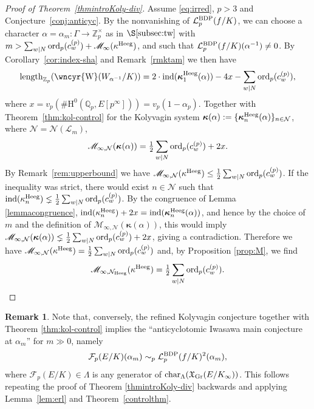 \documentclass[10pt,reqno]{amsart}
\numberwithin{equation}{section}
\theoremstyle{plain}
\theoremstyle{definition}
\newtheorem{rmk}[thm]{Remark}
\theoremstyle{definition}
\theoremstyle{plain}
\theoremstyle{plain}
\theoremstyle{plain}
\theoremstyle{plain}
\theoremstyle{plain}
\theoremstyle{plain}
\newcommand{\ind}{\operatorname{ind}}
\newcommand{\Z}{\mathbb{Z}}
\newcommand{\Q}{\mathbb{Q}}
\newcommand{\bkappa}{\boldsymbol{\kappa}}
\newcommand{\sha}{\text{\wncyr{W}}}
\newcommand{\Lcal}{\mathcal{L}}
\newcommand{\Fcal}{\mathcal{F}}
\newcommand{\cL}{\mathcal{L}}
\newcommand{\cN}{\mathcal{N}}
\newcommand{\kap}{\kappa}
\newcommand{\rH}{\mathrm{H}}
\begin{document}
\begin{proof}[Proof of Theorem~\ref{thmintroKoly-div}]
Assume \eqref{eq:irred}, $p>3$ and Conjecture~\ref{conj:anticyc}. By the nonvanishing of $\Lcal_p^{\rm BDP}(f/K)$, %
we can choose a character $\alpha=\alpha_m:\Gamma\rightarrow\Z_p^\times$ as in $\S\ref{subsec:tw}$ with $m>\sum_{w\mid N}{\rm ord}_p(c_w^{(p)})+\mathscr{M}_\infty(\kappa^{\rm Heeg})$, and such that $\Lcal_p^{\rm BDP}(f/K)(\alpha^{-1})\neq 0$. By Corollary~\ref{cor:index-sha} and Remark~\ref{rmktam} we then have 
\begin{equation}\label{eq:control-divalpha}
{\rm length}_{\Z_p}(\sha(W_{\alpha^{-1}}/K))=2\cdot\ind(\bkappa_1^{\rm Heeg}(\alpha))-4x-\sum_{w\mid N}{\rm ord}_p(c_w^{(p)}),
\end{equation}
where $x= v_p(\#\rH^0(\Q_p,E[p^\infty]))= v_p(1-\alpha_p)$.
Together with Theorem~\ref{thm:kol-control} for the Kolyvagin system $\bkappa(\alpha):=\{\bkappa^{\rm Heeg}_n(\alpha)\}_{n\in\mathcal{N}}$, where $\mathcal{N}=\mathcal{N}(\cL_{m})$,
\[
\mathscr{M}_{\infty,\cN}(\bkappa(\alpha))=\tfrac{1}{2}\sum_{w\mid N}{\rm ord}_p(c_w^{(p)})+2x.
\]
By Remark~\ref{rem:upperbound} we have $\mathscr{M}_{\infty,\cN}(\kappa^{\rm Heeg}) \leq \tfrac{1}{2}\sum_{w\mid N}{\rm ord}_p(c_w^{(p)})$. If the inequality was strict, there would exist $n\in\mathcal{N}$ such that $\ind(\kappa_n^{\rm Heeg})\lneq \tfrac{1}{2}\sum_{w\mid N}{\rm ord}_p(c_w^{(p)})$. By the congruence of Lemma \ref{lemmacongruence}, $\ind(\kappa_n^{\rm Heeg})+2x=\ind(\bkappa_n^{\rm Heeg}(\alpha))$, and hence by the choice of $m$ and the definition of $\mathscr{M}_{\infty,\cN}(\bkappa(\alpha))$, this would imply $\mathscr{M}_{\infty,\cN}(\bkappa(\alpha))\lneq \tfrac{1}{2}\sum_{w\mid N}{\rm ord}_p(c_w^{(p)})+2x$, giving a contradiction. Therefore we have $\mathscr{M}_{\infty,\cN}(\kappa^{\rm Heeg}) = \tfrac{1}{2}\sum_{w\mid N}{\rm ord}_p(c_w^{(p)})$ and, by Proposition \ref{prop:M}, we find
\[
\mathscr{M}_{\infty,\cN_{\rm Heeg}}(\kappa^{\rm Heeg})= \tfrac{1}{2}\sum_{w\mid N}{\rm ord}_p(c_w^{(p)}).
\]
\end{proof}

\begin{rmk}
Note that, conversely, the refined Kolyvagin conjecture together with Theorem \ref{thm:kol-control} implies the ``anticyclotomic Iwasawa main conjecture at $\alpha_m$'' for $m\gg 0$, namely 
\[
\Fcal_p(E/K)(\alpha_m)\sim_p\Lcal_p^{\rm BDP}(f/K)^2(\alpha_m),
\]
where $\Fcal_p(E/K)\in\Lambda$ is any generator of ${\rm char}_\Lambda(\mathfrak{X}_{\rm Gr}(E/K_\infty))$. This follows repeating the proof of
Theorem \ref{thmintroKoly-div} backwards and applying Lemma~\ref{lem:erl} and Theorem~\ref{controlthm}. 
\end{rmk}
\end{document}
